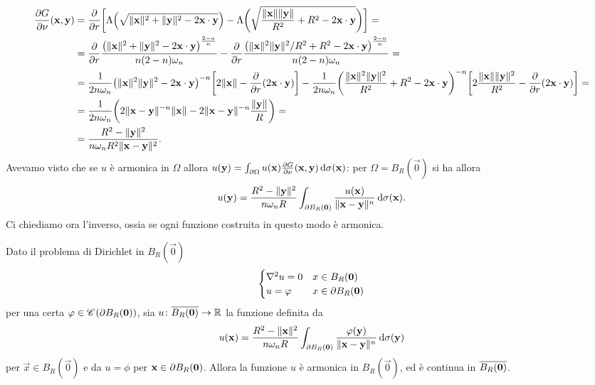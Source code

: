 \begin{equation}
    \begin{split}
        \frac{\partial {G}}{\partial {\nu}}(\mathbf{x},\mathbf{y})&=
        \frac{\partial {}}{\partial {r}}\biggl[\Lambda\Bigl(\sqrt{\lVert\mathbf{x}\rVert^2+\lVert\mathbf{y}\rVert^2-2{\mathbf{x}}\cdot{\mathbf{y}}}\Bigr)-\Lambda\biggl(\sqrt{\frac{\lVert\mathbf{x}\rVert\lVert\mathbf{y}\rVert}{R^2}+R^2-2{\mathbf{x}}\cdot{\mathbf{y}}}\biggr)\biggr]=\\&=
        \frac{\partial {}}{\partial {r}}\frac{\bigl(\lVert\mathbf{x}\rVert^2+\lVert\mathbf{y}\rVert^2-2{\mathbf{x}}\cdot{\mathbf{y}}\bigr)^\frac{2-n}{n}}{n(2-n)\omega_n}-\frac{\partial {}}{\partial {r}}\frac{\bigl(\lVert\mathbf{x}\rVert^2\lVert\mathbf{y}\rVert^2/R^2+R^2-2{\mathbf{x}}\cdot{\mathbf{y}}\bigr)^\frac{2-n}{n}}{n(2-n)\omega_n}=\\&=
        \frac1{2n\omega_n}\bigl(\lVert\mathbf{x}\rVert^2\lVert\mathbf{y}\rVert^2-2{\mathbf{x}}\cdot{\mathbf{y}}\bigr)^{-n}\biggl[2\lVert\mathbf{x}\rVert-\frac{\partial {}}{\partial {r}}(2{\mathbf{x}}\cdot{\mathbf{y}})\biggr]-\frac1{2n\omega_n}\biggl(\frac{\lVert\mathbf{x}\rVert^2\lVert\mathbf{y}\rVert^2}{R^2}+R^2-2{\mathbf{x}}\cdot{\mathbf{y}}\biggr)^{-n}\biggl[2\frac{\lVert\mathbf{x}\rVert\lVert\mathbf{y}\rVert^2}{R^2}-\frac{\partial {}}{\partial {r}}(2{\mathbf{x}}\cdot{\mathbf{y}})\biggr]=\\&=
        \frac1{2n\omega_n}\biggl(2\lVert\mathbf{x}-\mathbf{y}\rVert^{-n}\lVert\mathbf{x}\rVert-2\lVert\mathbf{x}-\mathbf{y}\rVert^{-n}\frac{\lVert\mathbf{y}\rVert}{R}\biggr)=\\&=
        \frac{R^2-\lVert\mathbf{y}\rVert^2}{n\omega_nR^2\lVert\mathbf{x}-\mathbf{y}\rVert^2}.
    \end{split}
\end{equation}
Avevamo visto che se $u$ è armonica in $\Omega$ allora $u(\mathbf{y})=\int_{\partial\Omega} u(\mathbf{x})\frac{\partial {G}}{\partial {\nu}}(\mathbf{x},\mathbf{y})\,\textup{d}\sigma(\mathbf{x})$: per $\Omega=B_R(\vec 0)$ si ha allora
\begin{equation}
    u(\mathbf{y})=\frac{R^2-\lVert\mathbf{y}\rVert^2}{n\omega_nR}\int_{\partial B_R(\mathbf{0})}\frac{u(\mathbf{x})}{\lVert\mathbf{x}-\mathbf{y}\rVert^n}\,\textup{d}\sigma(\mathbf{x}).
    \label{eq:rappresentazione-green-palla}
\end{equation}
Ci chiediamo ora l'inverso, ossia se ogni funzione costruita in questo modo è armonica.
\begin{teorema} \label{t:laplace-rappresentazione-poisson}
    Dato il problema di Dirichlet in $B_R(\vec 0)$
    \begin{equation}
        \begin{cases}
            \nabla^2 u=0 & x\in B_R(\mathbf{0})\\
            u=\varphi   & x\in\partial B_R(\mathbf{0})
        \end{cases}
    \end{equation}
    per una certa $\varphi\in\mathscr C^{}(\partial B_R(\mathbf{0}))$, sia $u\colon\overline{B_R(\mathbf{0})}\to\mathbb{R}$ la funzione definita da
    \begin{equation}
        u(\mathbf{x})=\frac{R^2-\lVert\mathbf{x}\rVert^2}{n\omega_n R}\int_{\partial B_R(\mathbf{0})}\frac{\varphi(\mathbf{y})}{\lVert\mathbf{x}-\mathbf{y}\rVert^n}\,\textup{d}\sigma(\mathbf{y})
    \end{equation}
    per $\vec x\in B_R(\vec 0)$ e da $u=\phi$ per $\mathbf{x}\in\partial B_R(\mathbf{0})$.
    Allora la funzione $u$ è armonica in $B_R(\vec 0)$, ed è continua in $\overline{B_R(\mathbf{0})}$.
\end{teorema}
